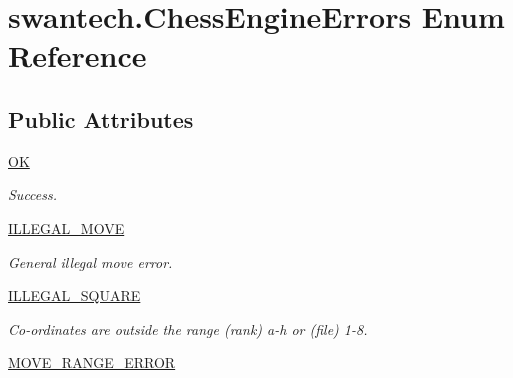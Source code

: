 \hypertarget{enumswantech_1_1_chess_engine_errors}{}\section{swantech.\+Chess\+Engine\+Errors Enum Reference}
\label{enumswantech_1_1_chess_engine_errors}
\subsection*{Public Attributes}
\begin{DoxyCompactItemize}
\item 
\hypertarget{enumswantech_1_1_chess_engine_errors_a6e26430f10fe122419147d156b9c15f2}{}\hyperlink{enumswantech_1_1_chess_engine_errors_a6e26430f10fe122419147d156b9c15f2}{O\+K}\label{enumswantech_1_1_chess_engine_errors_a6e26430f10fe122419147d156b9c15f2}

\begin{DoxyCompactList}\small\item\em Success. \end{DoxyCompactList}\item 
\hypertarget{enumswantech_1_1_chess_engine_errors_a2aeeebfd4d1e2794ead2967f6ec1788d}{}\hyperlink{enumswantech_1_1_chess_engine_errors_a2aeeebfd4d1e2794ead2967f6ec1788d}{I\+L\+L\+E\+G\+A\+L\+\_\+\+M\+O\+V\+E}\label{enumswantech_1_1_chess_engine_errors_a2aeeebfd4d1e2794ead2967f6ec1788d}

\begin{DoxyCompactList}\small\item\em General illegal move error. \end{DoxyCompactList}\item 
\hypertarget{enumswantech_1_1_chess_engine_errors_a86ec8de84d4b1c0c89c8d12e4dbc65d9}{}\hyperlink{enumswantech_1_1_chess_engine_errors_a86ec8de84d4b1c0c89c8d12e4dbc65d9}{I\+L\+L\+E\+G\+A\+L\+\_\+\+S\+Q\+U\+A\+R\+E}\label{enumswantech_1_1_chess_engine_errors_a86ec8de84d4b1c0c89c8d12e4dbc65d9}

\begin{DoxyCompactList}\small\item\em Co-\/ordinates are outside the range (rank) a-\/h or (file) 1-\/8. \end{DoxyCompactList}\item 
\hypertarget{enumswantech_1_1_chess_engine_errors_a51f6db3c6824fee4054352f2be62b19d}{}\hyperlink{enumswantech_1_1_chess_engine_errors_a51f6db3c6824fee4054352f2be62b19d}{M\+O\+V\+E\+\_\+\+R\+A\+N\+G\+E\+\_\+\+E\+R\+R\+O\+R}\label{enumswantech_1_1_chess_engine_errors_a51f6db3c6824fee4054352f2be62b19d}


\end{DoxyCompactItemize}
